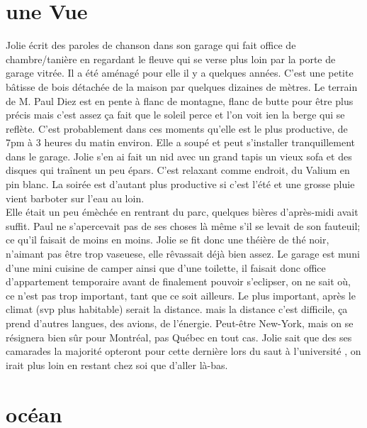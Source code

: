 \documentclass{article}
\begin{document}
\section*{une Vue}
Jolie écrit des paroles de chanson dans son garage qui fait office de
chambre/tanière en regardant le fleuve qui se verse plus loin par la porte de
garage vitrée. Il a été aménagé pour elle il y a quelques années. C’est une
petite bâtisse de bois détachée de la maison par quelques dizaines de mètres.
Le terrain de M. Paul Diez est en pente à flanc de montagne, flanc de butte
pour être plus précis mais c’est assez ça fait que le soleil perce et l’on voit
ien la berge qui se reflète.  C’est probablement dans ces moments qu’elle est
le plus productive, de 7pm à 3 heures du matin environ. Elle a  soupé et peut
s’installer tranquillement dans le garage. Jolie s’en ai fait un nid avec un
grand tapis un vieux sofa et des disques qui traînent un peu épars. C’est
relaxant comme endroit, du Valium en pin blanc. La soirée est d’autant plus
productive si c’est l’été et une grosse pluie vient barboter sur l'eau au
loin.\\

Elle était un peu émèchée en rentrant du parc, quelques bières d'après-midi
avait suffit. Paul ne s'apercevait pas de ses choses là même s'il se levait de
son fauteuil; ce qu'il faisait de moins en moins. Jolie se fit donc une théière
de thé noir, n'aimant pas être trop vaseuese, elle rêvassait déjà bien assez.
Le garage est muni d'une mini cuisine de camper ainsi que d'une toilette, il
faisait donc office d'appartement temporaire avant de finalement pouvoir
s'eclipser, on ne sait où, ce n'est pas trop important, tant que ce soit
ailleurs. Le plus important, après le climat (svp plus habitable) serait la
distance. mais la distance c'est difficile, ça prend d'autres langues, des
avions, de l'énergie. Peut-être New-York, mais on se résignera bien sûr pour
Montréal, pas Québec en tout cas. Jolie sait que des ses camarades la majorité
opteront pour cette dernière lors du saut à l'université , on irait plus loin
en restant chez soi que d'aller là-bas.



\clearpage

\section*{océan}
\end{document}
